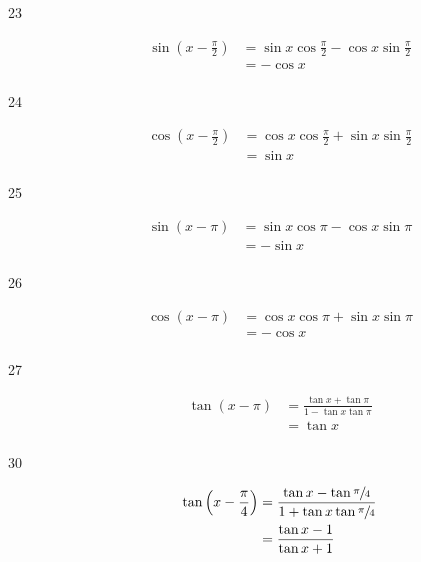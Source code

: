 \documentclass{exam}
\begin{document}
\begin{description}
      \item[23] 
        \begin{align*}
          \sin \left( x - \frac{\pi}{2} \right) & = \sin x \cos \frac{\pi}{2} - \cos x \sin \frac{\pi}{2} \\
                                                & = - \cos x \\
        \end{align*}

      \item[24] 
        \begin{align*}
          \cos \left( x - \frac{\pi}{2} \right) & = \cos x \cos \frac{\pi}{2} + \sin x \sin \frac{\pi}{2} \\
                                                & = \sin x \\
        \end{align*}

      \item[25] 
        \begin{align*}
          \sin(x - \pi) & = \sin x \cos \pi - \cos x \sin \pi \\
                        & = - \sin x \\
        \end{align*}

      \item[26] 
        \begin{align*}
          \cos(x - \pi) & = \cos x \cos \pi + \sin x \sin \pi \\
                        & = - \cos x \\
        \end{align*}

      \item[27] 
        \begin{align*}
          \tan(x - \pi) & = \frac{\tan x + \tan \pi}{1 - \tan x \tan \pi} \\
                        & = \tan x \\
        \end{align*}

      \item[30] 
        \begin{align*}
          \tan \left(x - \frac{\pi}{4} \right) & = \frac{\tan x - \tan \sfrac{\pi}{4}}{1 + \tan x \tan \sfrac{\pi}{4}} \\
                                               & = \frac{\tan x - 1}{\tan x + 1} \\
        \end{align*}


\end{description}
\end{document}
